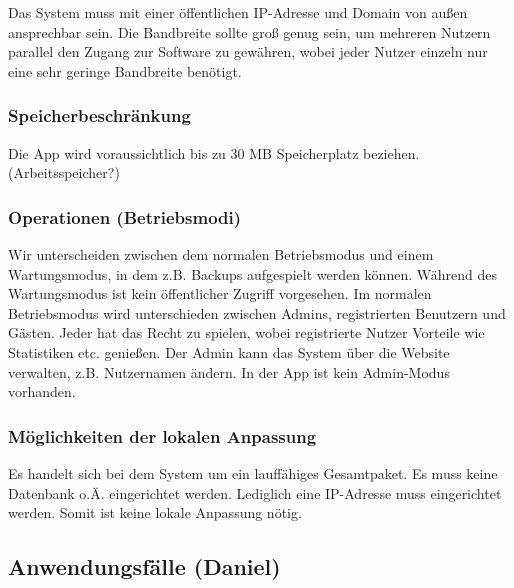 \documentclass[fontsize=12pt,paper=a4,twoside]{scrartcl}
\begin{document}
Das System muss mit einer öffentlichen IP-Adresse und Domain von außen ansprechbar sein. Die Bandbreite sollte groß genug sein, um mehreren Nutzern parallel den Zugang zur Software zu gewähren, wobei jeder Nutzer einzeln nur eine sehr geringe Bandbreite benötigt.

\subsubsection{Speicherbeschränkung}


Die App wird voraussichtlich bis zu 30 MB Speicherplatz beziehen. (Arbeitsspeicher?)


\subsubsection{Operationen (Betriebsmodi)}

Wir unterscheiden zwischen dem normalen Betriebsmodus und einem Wartungsmodus, in dem z.B. Backups aufgespielt werden können. Während des Wartungsmodus ist kein öffentlicher Zugriff vorgesehen. Im normalen Betriebsmodus wird unterschieden zwischen Admins, registrierten Benutzern und Gästen. Jeder hat das Recht zu spielen, wobei registrierte Nutzer Vorteile wie Statistiken etc. genießen. Der Admin kann das System über die Website verwalten, z.B. Nutzernamen ändern. In der App ist kein Admin-Modus vorhanden.

\subsubsection{Möglichkeiten der lokalen Anpassung}
  
Es handelt sich bei dem System um ein lauffähiges Gesamtpaket. Es muss keine Datenbank o.Ä. eingerichtet werden. Lediglich eine IP-Adresse muss eingerichtet werden. Somit ist keine lokale Anpassung nötig.

\subsection{Anwendungsfälle (Daniel)}
\end{document}
